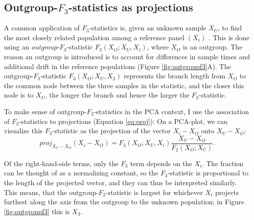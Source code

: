 \documentclass[12pt,fullpage, a4paper]{article}
\newcommand{\vectorproj}[2][]{\textit{proj}_{#1}#2}
\begin{document}
\subsection{Outgroup-$F_3$-statistics as projections}
A common application of $F_3$-statistics is, given an unknown sample $X_U$, to find the most closely related population among a reference panel $(X_i)$ \citep{raghavan2014}. This is done  using an \emph{outgroup}-$F_3$-statistic $F_3(X_O; X_U, X_i)$, where $X_O$ is an outgroup. The reason an outgroup is introduced is to account for differences in sample times and additional drift in the reference populations (Figure \ref{fig:outgroupf3}A). The outgroup-$F_3$-statistic $F_3(X_O; X_U, X_3)$ represents the branch length from $X_O$ to the common node between the three samples in the statistic, and the closer this node is to $X_U$, the longer the branch and hence the larger the $F_3$-statistic. 

To make sense of outgroup-$F_3$-statistics in the PCA context, I use the association of $F_3$-statistics to projections (Equation \ref{eq:proj}):
On a PCA-plot, we can visualize this $F_3$-statistic as the projection of the vector $X_i - X_O$ onto $X_U - X_O$: 
$$\vectorproj[X_U - X_O]{(X_i - X_O)} =F_3(X_O; X_U, X_i) \frac{X_U - X_O}{F_2(X_O; X_U)}.$$

Of the right-hand-side terms, only the $F_3$ term depends on the $X_i$. The fraction can be thought of as a normalizing constant,  so the $F_3$-statistic is proportional to the length of  the projected vector, and they can thus be interpreted similarly. This means, that the outgroup-$F_3$-statistic is largest for whichever $X_i$ projects furthest along the axis from the outgroup to the unknown population; in Figure \ref{fig:outgroupf3} this is $X_3$.
\end{document}

